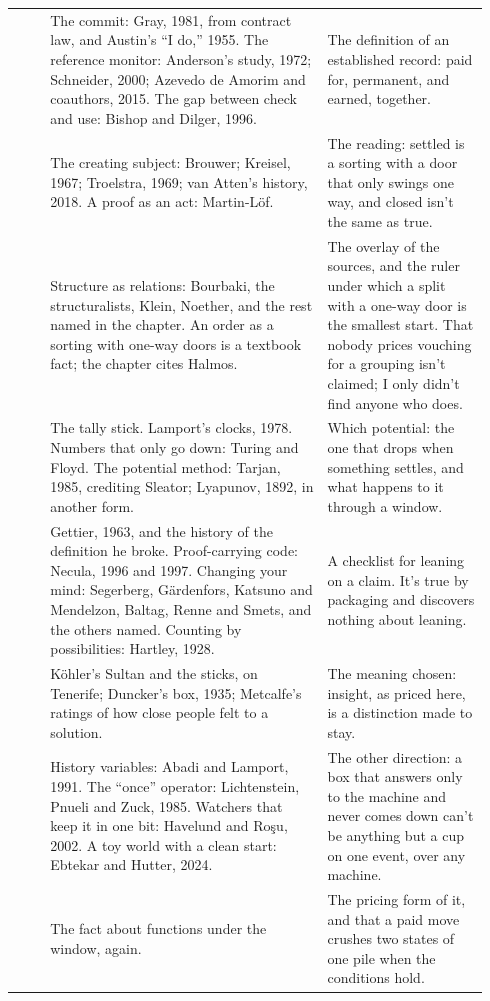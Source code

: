 \documentclass[11pt,twoside]{article}
\theoremstyle{thielethm}
\theoremstyle{thieledef}
\theoremstyle{thieledef}
\theoremstyle{thieledef}
\theoremstyle{thielethm}
\theoremstyle{thieleobs}
\theoremstyle{thielethm}
\begin{document}
\begin{longtable}{@{}>{\raggedright\arraybackslash}p{0.07\linewidth}>{\raggedright\arraybackslash}p{0.55\linewidth}>{\raggedright\arraybackslash}p{0.32\linewidth}@{}}
8 & The commit: Gray, 1981, from contract law, and Austin's ``I do,'' 1955. The reference monitor: Anderson's study, 1972; Schneider, 2000; Azevedo de Amorim and coauthors, 2015. The gap between check and use: Bishop and Dilger, 1996. & The definition of an established record: paid for, permanent, and earned, together. \\
9 & The creating subject: Brouwer; Kreisel, 1967; Troelstra, 1969; van Atten's history, 2018. A proof as an act: Martin-L\"of. & The reading: settled is a sorting with a door that only swings one way, and closed isn't the same as true. \\
10 & Structure as relations: Bourbaki, the structuralists, Klein, Noether, and the rest named in the chapter. An order as a sorting with one-way doors is a textbook fact; the chapter cites Halmos. & The overlay of the sources, and the ruler under which a split with a one-way door is the smallest start. That nobody prices vouching for a grouping isn't claimed; I only didn't find anyone who does. \\
11 & The tally stick. Lamport's clocks, 1978. Numbers that only go down: Turing and Floyd. The potential method: Tarjan, 1985, crediting Sleator; Lyapunov, 1892, in another form. & Which potential: the one that drops when something settles, and what happens to it through a window. \\
12 & Gettier, 1963, and the history of the definition he broke. Proof-carrying code: Necula, 1996 and 1997. Changing your mind: Segerberg, G\"ardenfors, Katsuno and Mendelzon, Baltag, Renne and Smets, and the others named. Counting by possibilities: Hartley, 1928. & A checklist for leaning on a claim. It's true by packaging and discovers nothing about leaning. \\
13 & K\"ohler's Sultan and the sticks, on Tenerife; Duncker's box, 1935; Metcalfe's ratings of how close people felt to a solution. & The meaning chosen: insight, as priced here, is a distinction made to stay. \\
14 & History variables: Abadi and Lamport, 1991. The ``once'' operator: Lichtenstein, Pnueli and Zuck, 1985. Watchers that keep it in one bit: Havelund and Ro\c{s}u, 2002. A toy world with a clean start: Ebtekar and Hutter, 2024. & The other direction: a box that answers only to the machine and never comes down can't be anything but a cup on one event, over any machine. \\
15 & The fact about functions under the window, again. & The pricing form of it, and that a paid move crushes two states of one pile when the conditions hold. \\

\end{longtable}
\end{document}
